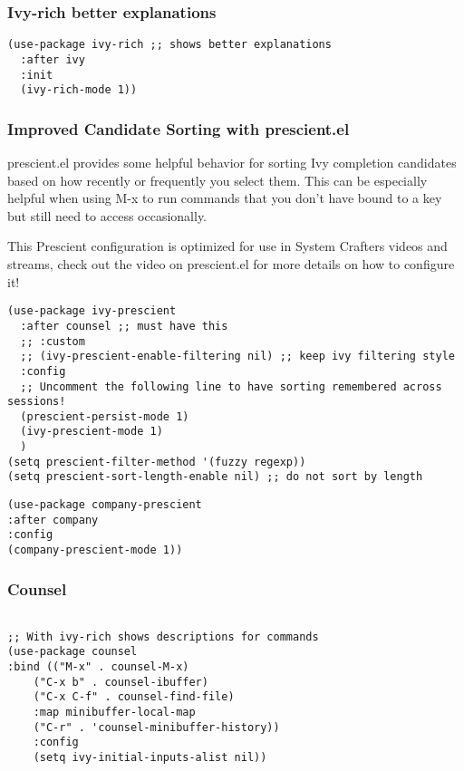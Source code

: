 \documentclass[11pt]{article}
\begin{document}
\subsubsection{Ivy-rich better explanations}
\label{sec:org8ccf08a}
\begin{verbatim}
(use-package ivy-rich ;; shows better explanations
  :after ivy
  :init
  (ivy-rich-mode 1))
\end{verbatim}
\subsubsection{Improved Candidate Sorting with prescient.el}
\label{sec:orga12a20b}
prescient.el provides some helpful behavior for sorting Ivy completion candidates based on how recently or frequently you select them. This can be especially helpful when using M-x to run commands that you don’t have bound to a key but still need to access occasionally.

This Prescient configuration is optimized for use in System Crafters videos and streams, check out the video on prescient.el for more details on how to configure it!
\begin{verbatim}
(use-package ivy-prescient
  :after counsel ;; must have this
  ;; :custom
  ;; (ivy-prescient-enable-filtering nil) ;; keep ivy filtering style
  :config
  ;; Uncomment the following line to have sorting remembered across sessions!
  (prescient-persist-mode 1)
  (ivy-prescient-mode 1)
  )
(setq prescient-filter-method '(fuzzy regexp))
(setq prescient-sort-length-enable nil) ;; do not sort by length
\end{verbatim}

\begin{verbatim}
(use-package company-prescient
:after company
:config
(company-prescient-mode 1))

\end{verbatim}

\subsubsection{Counsel}
\label{sec:org60620d6}
\begin{verbatim}

;; With ivy-rich shows descriptions for commands 
(use-package counsel
:bind (("M-x" . counsel-M-x)
	("C-x b" . counsel-ibuffer)
	("C-x C-f" . counsel-find-file)
	:map minibuffer-local-map
	("C-r" . 'counsel-minibuffer-history))
	:config
	(setq ivy-initial-inputs-alist nil))
\end{verbatim}
\end{document}
